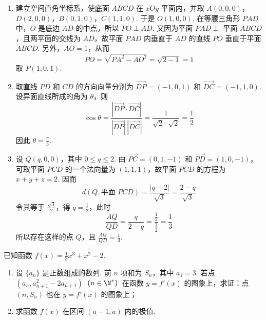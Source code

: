 \begin{solution}
\begin{enumerate}
\item 建立空间直角坐标系，使底面 \(ABCD\) 在 \(xOy\) 平面内，并取 \(A(0,0,0)\)，\(D(2,0,0)\)，\(B(0,1,0)\)，\(C(1,1,0)\). 于是 \(O(1,0,0)\). 在等腰三角形 \(PAD\) 中，\(O\) 是底边 \(AD\) 的中点，所以 \(PO\perp AD\). 又因为平面 \(PAD\perp\) 平面 \(ABCD\)，且两平面的交线为 \(AD\)，故平面 \(PAD\) 内垂直于 \(AD\) 的直线 \(PO\) 垂直于平面 \(ABCD\). 另外，\(AO=1\)，从而
\[
PO=\sqrt{PA^2-AO^2}=\sqrt{2-1}=1
\]
取 \(P(1,0,1)\).

\item 取直线 \(PD\) 和 \(CD\) 的方向向量分别为 \(\overrightarrow{DP}=(-1,0,1)\) 和 \(\overrightarrow{DC}=(-1,1,0)\). 设异面直线所成的角为 \(\theta\)，则
\[
\cos\theta=\frac{\left|\overrightarrow{DP}\cdot\overrightarrow{DC}\right|}{|\overrightarrow{DP}|\,|\overrightarrow{DC}|}=\frac{1}{\sqrt{2}\cdot\sqrt{2}}=\frac{1}{2}
\]
因此 \(\theta=\frac{\pi}{3}\).

\item 设 \(Q(q,0,0)\)，其中 \(0\leqslant q\leqslant2\). 由 \(\overrightarrow{PC}=(0,1,-1)\) 和 \(\overrightarrow{PD}=(1,0,-1)\)，可取平面 \(PCD\) 的一个法向量为 \((1,1,1)\)，故平面 \(PCD\) 的方程为 \(x+y+z=2\). 因而
\[
d(Q,\text{平面 }PCD)=\frac{|q-2|}{\sqrt{3}}=\frac{2-q}{\sqrt{3}}
\]
令其等于 \(\frac{\sqrt{3}}{2}\)，得 \(q=\frac{1}{2}\)，此时
\[
\frac{AQ}{QD}=\frac{q}{2-q}=\frac{\frac{1}{2}}{\frac{3}{2}}=\frac{1}{3}
\]
所以存在这样的点 \(Q\)，且 \(\frac{AQ}{QD}=\frac{1}{3}\).
\end{enumerate}
\end{solution}

\begin{problem}
已知函数 \( f(x) = \frac{1}{3}x^3 + x^2 - 2 \).
\begin{enumerate}
\item 设 \(\{a_n\}\) 是正数组成的数列. 前 \(n\) 项和为 \(S_n\)，其中 \(a_{1} = 3\). 若点 \((a_{n}, a_{n+1}^{2} - 2a_{n+1})\)（\(n \in \N^*\)）在函数 \(y = f'(x)\) 的图象上，求证：点 \((n, S_{n})\) 也在 \(y = f'(x)\) 的图象上；
\item 求函数 \( f(x) \) 在区间 \( (a-1, a) \) 内的极值.
\end{enumerate}
\end{problem}

